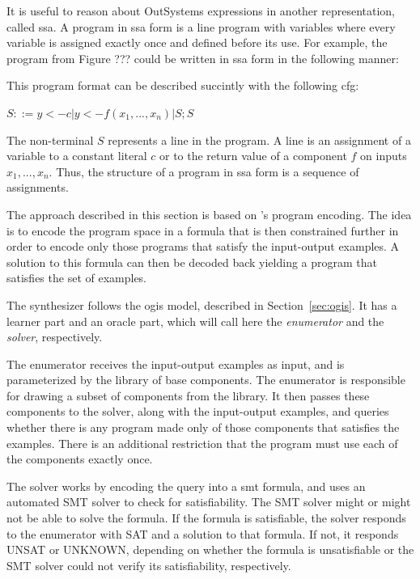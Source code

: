 It is useful to reason about OutSystems expressions in another representation,
called \gls{ssa}. A program in \gls{ssa} form is a line program with variables
where every variable is assigned exactly once and defined before its use. For
example, the program from Figure ??? could be written in \gls{ssa} form in the
following manner:


This program format can be described succintly with the following \gls{cfg}:

$S ::= y <- c | y <- f(x_1, ..., x_n) | S;S$

The non-terminal $S$ represents a line in the program. A line is an assignment
of a variable to a constant literal $c$ or to the return value of a component
$f$ on inputs $x_1, ..., x_n$. Thus, the structure of a program in \gls{ssa}
form is a sequence of assignments.

The approach described in this section is based on
\citeauthor{Jha:oracle:2010}'s program encoding. The idea is to encode the
program space in a formula that is then constrained further in order to encode
only those programs that satisfy the input-output examples. A solution to this
formula can then be decoded back yielding a program that satisfies the set of
examples.

The synthesizer follows the \gls{ogis} model, described in
Section~\ref{sec:ogis}. It has a learner part and an oracle part, which will
call here the \textit{enumerator} and the \textit{solver}, respectively.

The enumerator receives the input-output examples as input, and is parameterized
by the library of base components. The enumerator is responsible for drawing a
subset of components from the library. It then passes these components to the
solver, along with the input-output examples, and queries whether there is any
program made only of those components that satisfies the examples. There is an
additional restriction that the program must use each of the components exactly
once.


The solver works by encoding the query into a \gls{smt} formula, and uses an
automated SMT solver to check for satisfiability. The SMT solver might or might
not be able to solve the formula. If the formula is satisfiable, the solver
responds to the enumerator with SAT and a solution to that formula. If not, it
responds UNSAT or UNKNOWN, depending on whether the formula is unsatisfiable or
the SMT solver could not verify its satisfiability, respectively.

